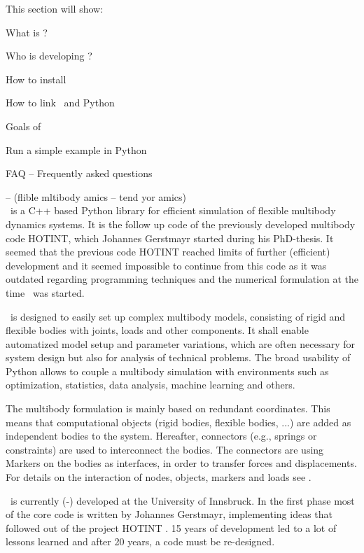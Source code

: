 This section will show:
\bn
  \item What is \codeName ?
  \item Who is developing \codeName ?
  \item How to install \codeName\ 
  \item How to link \codeName\ and Python
  \item Goals of \codeName
  \item Run a simple example in Python
  \item FAQ -- Frequently asked questions
\en

\codeName -- {\small (flible mltibody amics  -- tend yor amics)}\vspace{6pt}\\
\noindent \codeName\ is a C++ based Python library for efficient simulation of flexible multibody dynamics systems.
It is the follow up code of the previously developed multibody code HOTINT, which Johannes Gerstmayr started during his PhD-thesis.
It seemed that the previous code HOTINT reached limits of further (efficient) development and it seemed impossible to continue from this code as it was outdated regarding programming techniques and the numerical formulation at the time \codeName\ was started.

\codeName\ is designed to easily set up complex multibody models, consisting of rigid and flexible bodies with joints, loads and other components. It shall enable automatized model setup and parameter variations, which are often necessary for system design but also for analysis of technical problems. The broad usability of Python allows to couple a multibody simulation with environments such as optimization, statistics, data analysis, machine learning and others.

The multibody formulation is mainly based on redundant coordinates. This means that computational objects (rigid bodies, flexible bodies, ...) are added as independent bodies to the system. Hereafter, connectors (e.g., springs or constraints) are used to interconnect the bodies. The connectors are using Markers on the bodies as interfaces, in order to transfer forces and displacements.
For details on the interaction of nodes, objects, markers and loads see \refSection{sec:overview:items}.

\codeName\ is currently (\the\month-\the\year) developed at the University of Innsbruck.
In the first phase most of the core code is written by Johannes Gerstmayr, implementing ideas that followed out of the project HOTINT \cite{GerstmayrEtAl2013}. 15 years of development led to a lot of lessons learned and after 20 years, a code must be re-designed.

